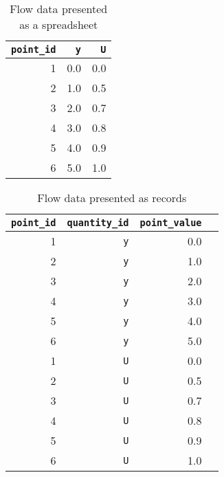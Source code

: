 \begin{table}[htb]
    \centering
    \footnotesize
    \begin{tabular}{ r | r r }
        \texttt{point\_id} & \texttt{y} & \texttt{U} \\
        \hline
                         1 &        0.0 &        0.0 \\
                         2 &        1.0 &        0.5 \\
                         3 &        2.0 &        0.7 \\
                         4 &        3.0 &        0.8 \\
                         5 &        4.0 &        0.9 \\
                         6 &        5.0 &        1.0
    \end{tabular}
    \caption{Flow data presented as a spreadsheet}
    \label{tab:flow-data-spreadsheet}
\end{table}

\begin{table}[htp]
    \centering
    \footnotesize
    \begin{tabular}{ r r | r r }
        \texttt{point\_id} & \texttt{quantity\_id} & \texttt{point\_value} \\
        \hline
                         1 & \texttt{y}            &                   0.0 \\
                         2 & \texttt{y}            &                   1.0 \\
                         3 & \texttt{y}            &                   2.0 \\
                         4 & \texttt{y}            &                   3.0 \\
                         5 & \texttt{y}            &                   4.0 \\
                         6 & \texttt{y}            &                   5.0 \\
                         1 & \texttt{U}            &                   0.0 \\
                         2 & \texttt{U}            &                   0.5 \\
                         3 & \texttt{U}            &                   0.7 \\
                         4 & \texttt{U}            &                   0.8 \\
                         5 & \texttt{U}            &                   0.9 \\
                         6 & \texttt{U}            &                   1.0
    \end{tabular}
    \caption{Flow data presented as records}
    \label{tab:flow-data-records}
\end{table}

